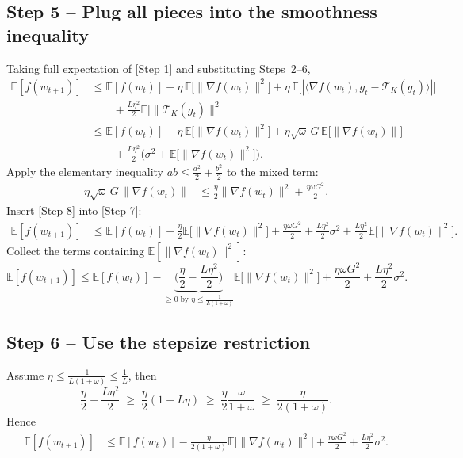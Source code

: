 \documentclass{article}
\newcommand{\TopK}{\mathcal{T}_K}
\newcommand{\E}{\mathbb{E}}
\begin{document}
\subsection*{Step 5 – Plug all pieces into the smoothness inequality}
Taking full expectation of \eqref{Step 1} and substituting Steps~2–6,
\begin{align}
\E[f(w_{t+1})]
&\le \E[f(w_t)]
   -\eta\,\E\!\big[\|\nabla f(w_t)\|^{2}\big]
   +\eta\,\E\!\big[|\langle\nabla f(w_t),g_t-\TopK(g_t)\rangle|\big] \nonumber\\
&\qquad +\frac{L\eta^{2}}{2}\E\!\big[\|\TopK(g_t)\|^{2}\big] \nonumber\\[4pt]
&\le \E[f(w_t)]
   -\eta\,\E\!\big[\|\nabla f(w_t)\|^{2}\big]
   +\eta\sqrt{\omega}\,G\,\E\!\big[\|\nabla f(w_t)\|\big] \nonumber\\
&\qquad +\frac{L\eta^{2}}{2}\big(\sigma^{2}+\E\!\big[\|\nabla f(w_t)\|^{2}\big]\big).
\tag{Step 7}
\end{align}
Apply the elementary inequality $ab\le\frac{a^{2}}{2}+ \frac{b^{2}}{2}$ to the mixed term:
\begin{align}
\eta\sqrt{\omega}\,G\,\|\nabla f(w_t)\|
&\le \frac{\eta}{2}\|\nabla f(w_t)\|^{2}
   +\frac{\eta\omega G^{2}}{2}.
\tag{Step 8}
\end{align}
Insert \eqref{Step 8} into \eqref{Step 7}:
\begin{align}
\E[f(w_{t+1})]
&\le \E[f(w_t)]
   -\frac{\eta}{2}\E\!\big[\|\nabla f(w_t)\|^{2}\big]
   +\frac{\eta\omega G^{2}}{2}
   +\frac{L\eta^{2}}{2}\sigma^{2}
   +\frac{L\eta^{2}}{2}\E\!\big[\|\nabla f(w_t)\|^{2}\big].
\tag{Step 9}
\end{align}
Collect the terms containing $\E[\|\nabla f(w_t)\|^{2}]$:
\[
\E[f(w_{t+1})]
\le \E[f(w_t)]
   -\underbrace{\Big(\frac{\eta}{2}-\frac{L\eta^{2}}{2}\Big)}_{\displaystyle\ge0\;\text{by }\eta\le\frac1{L(1+\omega)}}
   \E\!\big[\|\nabla f(w_t)\|^{2}\big]
   +\frac{\eta\omega G^{2}}{2}
   +\frac{L\eta^{2}}{2}\sigma^{2}.
\tag{Step 10}
\]

\subsection*{Step 6 – Use the stepsize restriction}
Assume $\eta\le\frac{1}{L(1+\omega)}\le\frac{1}{L}$, then
\[
\frac{\eta}{2}-\frac{L\eta^{2}}{2}
\;\ge\;
\frac{\eta}{2}(1-L\eta)
\;\ge\;
\frac{\eta}{2}\frac{\omega}{1+\omega}
\;\ge\;
\frac{\eta}{2(1+\omega)}.
\tag{Step 11}
\]
Hence
\begin{align}
\E[f(w_{t+1})]
&\le \E[f(w_t)]
   -\frac{\eta}{2(1+\omega)}\E\!\big[\|\nabla f(w_t)\|^{2}\big]
   +\frac{\eta\omega G^{2}}{2}
   +\frac{L\eta^{2}}{2}\sigma^{2}.
\tag{Step 12}
\end{align}
\end{document}
